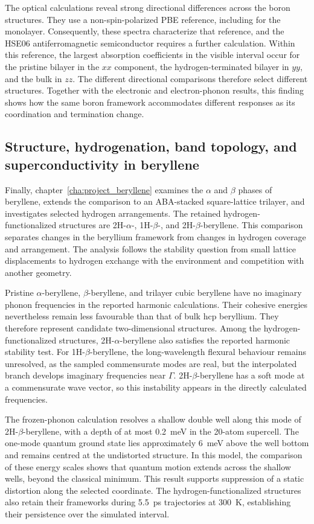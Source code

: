 The optical calculations reveal strong directional differences across the boron structures.
They use a non-spin-polarized PBE reference, including for the monolayer.
Consequently, these spectra characterize that reference, and the HSE06 antiferromagnetic semiconductor requires a further calculation.
Within this reference, the largest absorption coefficients in the visible interval occur for the pristine bilayer in the $xx$ component, the hydrogen-terminated bilayer in $yy$, and the bulk in $zz$.
The different directional comparisons therefore select different structures.
Together with the electronic and electron-phonon results, this finding shows how the same boron framework accommodates different responses as its coordination and termination change.

\FloatBarrier
\subsection{Structure, hydrogenation, band topology, and superconductivity in beryllene}

Finally, chapter~\ref{cha:project_beryllene} examines the $\alpha$ and $\beta$ phases of beryllene, extends the comparison to an ABA-stacked square-lattice trilayer, and investigates selected hydrogen arrangements.
The retained hydrogen-functionalized structures are 2H-$\alpha$-, 1H-$\beta$-, and 2H-$\beta$-beryllene.
This comparison separates changes in the beryllium framework from changes in hydrogen coverage and arrangement.
The analysis follows the stability question from small lattice displacements to hydrogen exchange with the environment and competition with another geometry.

Pristine $\alpha$-beryllene, $\beta$-beryllene, and trilayer cubic beryllene have no imaginary phonon frequencies in the reported harmonic calculations.
Their cohesive energies nevertheless remain less favourable than that of bulk hcp beryllium.
They therefore represent candidate two-dimensional structures.
Among the hydrogen-functionalized structures, 2H-$\alpha$-beryllene also satisfies the reported harmonic stability test.
For 1H-$\beta$-beryllene, the long-wavelength flexural behaviour remains unresolved, as the sampled commensurate modes are real, but the interpolated branch develops imaginary frequencies near $\Gamma$.
2H-$\beta$-beryllene has a soft mode at a commensurate wave vector, so this instability appears in the directly calculated frequencies.

The frozen-phonon calculation resolves a shallow double well along this mode of 2H-$\beta$-beryllene, with a depth of at most \qty{0.2}{\milli\electronvolt} in the 20-atom supercell.
The one-mode quantum ground state lies approximately \qty{6}{\milli\electronvolt} above the well bottom and remains centred at the undistorted structure.
In this model, the comparison of these energy scales shows that quantum motion extends across the shallow wells, beyond the classical minimum.
This result supports suppression of a static distortion along the selected coordinate.
The hydrogen-functionalized structures also retain their frameworks during \qty{5.5}{\pico\second} trajectories at \qty{300}{\kelvin}, establishing their persistence over the simulated interval.

